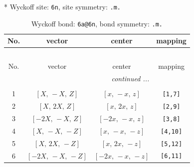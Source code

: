\documentclass[fleqn,8pt]{jsarticle}
\begin{document}
* Wyckoff site: {\tt 6n}, site symmetry: {\tt .m.}
\renewcommand{\arraystretch}{1.2}
\begin{longtable}{cccc}
\caption{Wyckoff bond: {\tt 6a@6n}, bond symmetry: {\tt .m.}}
 \\
 \hline \hline
No. & vector & center & mapping \\ \hline \endfirsthead

\multicolumn{3}{l}{\tablename\ \thetable{}} \\
 \hline \hline
No. & vector & center & mapping \\ \hline \endhead

 \hline \hline
\multicolumn{3}{r}{\footnotesize\it continued ...} \\ \endfoot

 \hline \hline
\multicolumn{3}{r}{} \\ \endlastfoot

1 & $\left[ X,\, - X,\, Z \right]$ & $\left[ x,\, - x,\, z \right]$ & {\tt [1,7]} \\ \hline
2 & $\left[ X,\, 2 X,\, Z \right]$ & $\left[ x,\, 2 x,\, z \right]$ & {\tt [2,9]} \\ \hline
3 & $\left[ - 2 X,\, - X,\, Z \right]$ & $\left[ - 2 x,\, - x,\, z \right]$ & {\tt [3,8]} \\ \hline
4 & $\left[ X,\, - X,\, - Z \right]$ & $\left[ x,\, - x,\, - z \right]$ & {\tt [4,10]} \\ \hline
5 & $\left[ X,\, 2 X,\, - Z \right]$ & $\left[ x,\, 2 x,\, - z \right]$ & {\tt [5,12]} \\ \hline
6 & $\left[ - 2 X,\, - X,\, - Z \right]$ & $\left[ - 2 x,\, - x,\, - z \right]$ & {\tt [6,11]} \\
\end{longtable}
\renewcommand{\arraystretch}{1.2}
\end{document}
